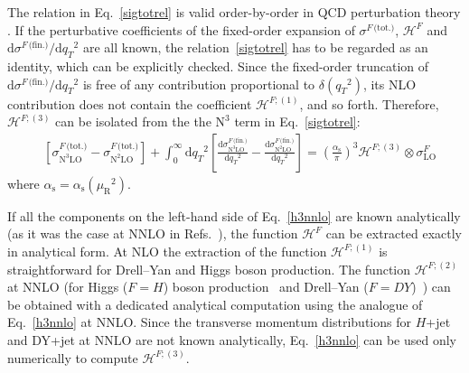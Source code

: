 \documentclass[12pt]{article}
\DeclareRobustCommand{\nn}{\nonumber}
\DeclareRobustCommand{\alphas}{\ensuremath{\alpha_{\mathrm{s}}}\xspace}
\DeclareRobustCommand{\as}{\alphas}
\DeclareRobustCommand{\asOpi}{\ensuremath{\left(\frac{\as}{\pi}\right)}} %
\DeclareRobustCommand{\mur}{\ensuremath{\mu_{\mathrm{R}}}\xspace}
\DeclareRobustCommand{\muR}{\mur}
\DeclareRobustCommand{\muf}{\ensuremath{\mu_{\mathrm{F}}}\xspace}
\DeclareRobustCommand{\qt}{\ensuremath{q_T}\xspace}
\DeclareRobustCommand{\rd}{\ensuremath{\mathrm{d}}}
\DeclareRobustCommand{\cH}{\ensuremath{\mathcal{H}}}
\DeclareRobustCommand{\fin}{\text{(fin.)}\xspace}
\DeclareRobustCommand{\tot}{\text{(tot.)}\xspace}
\DeclareRobustCommand{\LO}{\text{LO}\xspace}
\DeclareRobustCommand{\N}[1]{\ensuremath{\text{N}^{#1}}} %
\begin{document}
The relation in Eq.~\eqref{sigtotrel} is valid order-by-order in QCD perturbation theory \cite{Bozzi:2005wk}. If the perturbative coefficients of the fixed-order expansion of $\sigma^{F\,\tot}$, $\cH^F$ and $\rd \sigma^{F\,\fin}/\rd \qt^2$ are all known, the relation~\eqref{sigtotrel} has to be regarded as an identity, which can be explicitly checked. Since the fixed-order truncation of $\rd \sigma^{F\,\fin}/\rd \qt^2$ is free of any contribution proportional to $\delta(\qt^2)$, its NLO contribution  does not contain the coefficient $\cH^{F;(1)}$, and so forth. 
Therefore, $\cH^{F;(3)}$ can be isolated from the  the  \N3\LO  term in Eq.~\eqref{sigtotrel}:
\begin{align}
  &
  \left[
    \sigma^{F\,\tot}_{\N3\LO} - 
    \sigma^{F\,\tot}_{\N2\LO}
  \right] +
  \int_0^\infty\rd\qt^2 \left[
    \frac{\rd\sigma^{F\,\fin}_{\N3\LO}}{\rd\qt^2} -
    \frac{\rd\sigma^{F\,\fin}_{\N2\LO}}{\rd\qt^2}
  \right]
  =
  \asOpi^3 \cH^{F;(3)} \otimes \sigma^F_{\LO}
  \label{h3nnlo}
\end{align}
where $\as=\as(\muR^2)$.

If all the components on the left-hand side of Eq.~\eqref{h3nnlo} are known analytically (as it was the case at NNLO in Refs.~\cite{Catani:2011kr,Catani:2012qa}), the function $\cH^{F}$ can be extracted exactly in analytical form. At NLO the extraction of the function  $\cH^{F;(1)}$ is straightforward for Drell--Yan and Higgs boson production. The function $\cH^{F;(2)}$ at NNLO (for Higgs ($F=H$) boson production~\cite{Catani:2011kr} and Drell--Yan ($F=DY$)~\cite{Catani:2012qa}) can be obtained with a dedicated analytical computation using the analogue of Eq.~\eqref{h3nnlo} at NNLO. Since the transverse momentum distributions for $H$+jet and DY+jet at NNLO are not known analytically, Eq.~\eqref{h3nnlo} can be used only numerically to compute $\cH^{F;(3)}$. 
\end{document}
